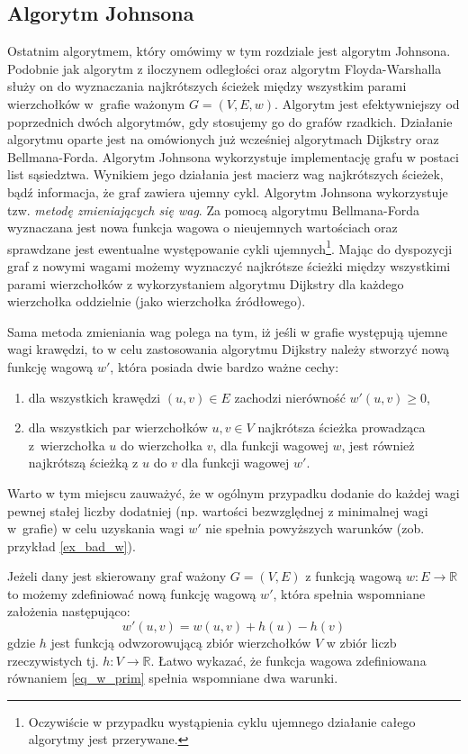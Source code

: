\documentclass[12pt,a4paper]{book}
\theoremstyle{definition}
\newcommand{\bR}{{\mathbb R}}
\numberwithin{equation}{chapter}
\begin{document}
\subsection{Algorytm Johnsona}
Ostatnim algorytmem, który omówimy w tym rozdziale jest algorytm Johnsona. Podobnie jak algorytm z iloczynem odległości oraz algorytm Floyda-Warshalla służy on do wyznaczania najkrótszych ścieżek między wszystkim parami wierzchołków w~grafie ważonym $G = (V, E, w)$. Algorytm jest efektywniejszy od poprzednich dwóch algorytmów, gdy stosujemy go do grafów rzadkich. Działanie algorytmu oparte jest na omówionych już wcześniej algorytmach Dijkstry oraz Bellmana-Forda. Algorytm Johnsona wykorzystuje implementację grafu w postaci list sąsiedztwa. Wynikiem jego działania jest macierz wag najkrótszych ścieżek, bądź informacja, że graf zawiera ujemny cykl.  Algorytm Johnsona wykorzystuje tzw. \textit{metodę zmieniających się wag}. Za pomocą  algorytmu Bellmana-Forda wyznaczana jest nowa funkcja wagowa o nieujemnych wartościach oraz sprawdzane jest ewentualne występowanie cykli ujemnych\footnote{Oczywiście w przypadku wystąpienia cyklu ujemnego działanie całego algorytmy jest przerywane.}. Mając do dyspozycji graf z nowymi wagami możemy wyznaczyć najkrótsze ścieżki między wszystkimi parami wierzchołków z wykorzystaniem algorytmu Dijkstry dla każdego wierzchołka oddzielnie (jako wierzchołka źródłowego). 

Sama metoda zmieniania wag polega na tym, iż jeśli w grafie występują ujemne wagi krawędzi, to w celu  zastosowania algorytmu Dijkstry należy stworzyć nową funkcję wagową $w'$, która posiada dwie bardzo ważne cechy:
\begin{enumerate}
\item dla wszystkich krawędzi $(u,v)\in E$ zachodzi nierówność $w'(u,v) \geq 0$,
\item dla wszystkich par wierzchołków $u, v \in V$  najkrótsza ścieżka prowadząca z~wierzchołka $u$ do wierzchołka $v$, dla funkcji wagowej $w$, jest również najkrótszą ścieżką z $u$ do $v$ dla funkcji wagowej $w'$.
\end{enumerate}

Warto w tym miejscu zauważyć, że w ogólnym przypadku dodanie do każdej wagi pewnej stałej liczby dodatniej (np. wartości bezwzględnej z minimalnej wagi w~grafie) w celu uzyskania wagi $w'$ nie spełnia powyższych warunków (zob. przykład \ref{ex_bad_w}). 

Jeżeli dany jest skierowany graf ważony $G =(V, E)$ z funkcją wagową $w: E \to \bR$ to możemy zdefiniować nową funkcję wagową $w'$, która spełnia wspomniane założenia następująco:
\begin{equation}
\label{eq_w_prim}
	w'(u, v) = w(u, v) + h(u) - h(v)
\end{equation}
gdzie $h$ jest funkcją odwzorowującą zbiór wierzchołków $V$ w zbiór liczb rzeczywistych tj. $h: V \to \bR$.
Łatwo wykazać, że funkcja wagowa zdefiniowana równaniem \eqref{eq_w_prim} spełnia wspomniane dwa warunki. 
\end{document}
